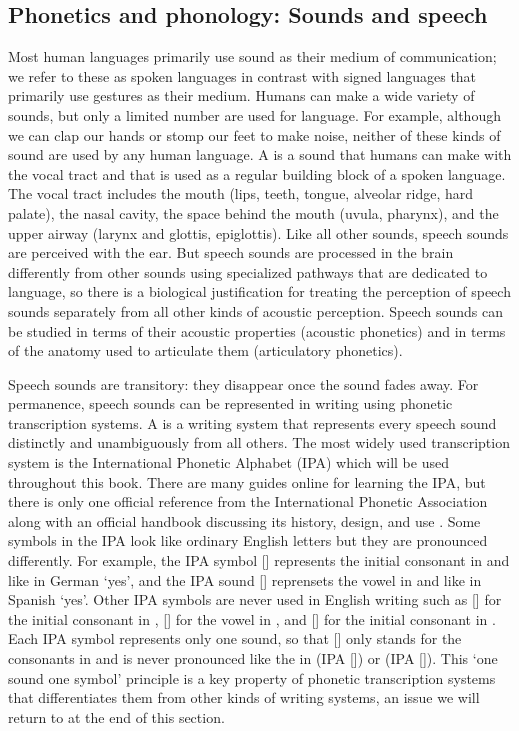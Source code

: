 \subsection{Phonetics and phonology: Sounds and speech}\label{sec:intro-ling-phon}

Most human languages primarily use sound as their medium of communication; we refer to these as spoken languages in contrast with signed languages that primarily use gestures as their medium. Humans can make a wide variety of sounds, but only a limited number are used for language. For example, although we can clap our hands or stomp our feet to make noise, neither of these kinds of sound are used by any human language. A  is a sound that humans can make with the vocal tract and that is used as a regular building block of a spoken language. The vocal tract includes the mouth (lips, teeth, tongue, alveolar ridge, hard palate), the nasal cavity, the space behind the mouth (uvula, pharynx), and the upper airway (larynx and glottis, epiglottis). Like all other sounds, speech sounds are perceived with the ear. But speech sounds are processed in the brain differently from other sounds using specialized pathways that are dedicated to language, so there is a biological justification for treating the perception of speech sounds separately from all other kinds of acoustic perception. Speech sounds can be studied in terms of their acoustic properties (acoustic phonetics) and in terms of the anatomy used to articulate them (articulatory phonetics).

Speech sounds are transitory: they disappear once the sound fades away. For permanence, speech sounds can be represented in writing using phonetic transcription systems. A  is a writing system that represents every speech sound distinctly and unambiguously from all others. The most widely used transcription system is the International Phonetic Alphabet (IPA) which will be used throughout this book. There are many guides online for learning the IPA, but there is only one official reference from the International Phonetic Association \parencite{international-phonetic-association:2018} along with an official handbook discussing its history, design, and use \parencite{international-phonetic-association:1999}. Some symbols in the IPA look like ordinary English letters but they are pronounced differently. For example, the IPA symbol [] represents the initial consonant in  and  like in German  ‘yes’, and the IPA sound [] reprensets the vowel in  and  like in Spanish  ‘yes’. Other IPA symbols are never used in English writing such as [] for the initial consonant in , [] for the vowel in , and [] for the initial consonant in . Each IPA symbol represents only one sound, so that [] only stands for the consonants in  and is never pronounced like the  in  (IPA []) or  (IPA []). This ‘one sound one symbol’ principle is a key property of phonetic transcription systems that differentiates them from other kinds of writing systems, an issue we will return to at the end of this section.

